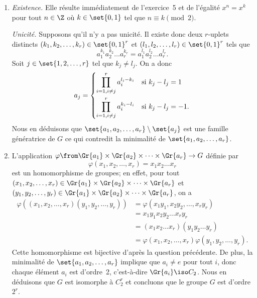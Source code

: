 \begin{enumerate}
  \item
    \emph{Existence.} 
    Elle résulte immédiatement de l'exercice~5 et de l'égalité $x^n = x^k$ pour tout $n\in\Z$ où $k\in\set{0,1}$ tel que $n\equiv k\pmod{2}$.
    
    \emph{Unicité.}
    Supposons qu'il n'y a pas unicité. 
    Il existe donc deux $r$-uplets distincts $(k_1,k_2,\dots,k_r)\in\set{0,1}^r$ et $(l_1,l_2,\dots,l_r)\in\set{0,1}^r$ tels que
    \[
      a_1^{k_1} a_2^{k_2} \dots a_r^{k_r} = a_1^{l_1} a_2^{l_2} \dots a_r^{l_r}.
    \]
    Soit $j\in\set{1,2,\dots,r}$ tel que $k_j\neq l_j$. 
    On a donc
    \[
      a_j = 
        \begin{dcases}
          \prod_{i=1,i\neq j}^r a_i^{l_i - k_i} & \text{si $k_j - l_j = 1$} \\
          \prod_{i=1,i\neq j}^r a_i^{k_i - l_i} & \text{si $k_j - l_j = -1$}.
        \end{dcases}
    \]
    Nous en déduisons que $\set{a_1,a_2,\dots,a_r}\setminus\set{a_j}$ est une famille génératrice de $G$ ce qui contredit la minimalité de $\set{a_1,a_2,\dots,a_r}$.
  
  \item
     L'application $\varphi\from\Gr{a_1}\times\Gr{a_2}\times\dots\times\Gr{a_r}\to G$ définie par 
     \[
       \varphi(x_1,x_2,\dots,x_r) = x_1x_2\dots x_r
     \]
     est un homomorphisme de groupes; en effet, pour tout $(x_1,x_2,\dots,x_r)\in\Gr{a_1}\times\Gr{a_2}\times\dots\times\Gr{a_r}$ et $(y_1,y_2,\dots,y_r)\in\Gr{a_1}\times\Gr{a_2}\times\dots\times\Gr{a_r}$, on a
     \begin{align*}
       \varphi((x_1,x_2,\dots,x_r)(y_1,y_2,\dots,y_r))
       &= \varphi(x_1y_1,x_2y_2,\dots,x_ry_r) \\
       &= x_1y_1x_2y_2\dots x_ry_r \\
       &= (x_1x_2\dots x_r)(y_1y_2\dots y_r) \\
       &= \varphi(x_1,x_2,\dots,x_r)\varphi(y_1,y_2,\dots,y_r).
     \end{align*}
     Cette homomorphisme est bijective d'après la question précédente. 
     De plus, la minimalité de $\set{a_1,a_2,\dots,a_r}$ implique que $a_i \neq e$ pour tout $i$, donc chaque élément $a_i$ est d'ordre~2, c'est-à-dire $\Gr{a_i}\iso C_2$.
     Nous en déduisons que $G$ est isomorphe à $C_2^r$ et concluons que le groupe $G$ est d'ordre $2^r$.
\end{enumerate}
